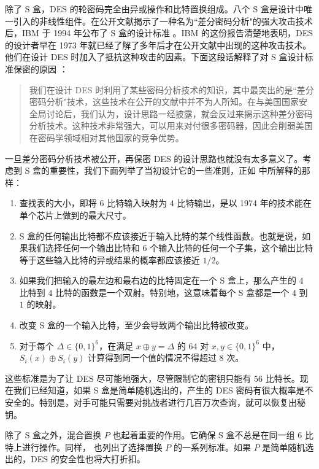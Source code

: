 \begin{snote}
\vspace*{10pt}

\noindent
除了 S 盒，DES 的轮密码完全由异或操作和比特置换组成。八个 S 盒是设计中唯一引入的非线性组件。在公开文献揭示了一种名为``差分密码分析"的强大攻击技术后，IBM 于 1994 年公布了 S 盒的设计标准 \cite{coppersmith1994data}。IBM 的这份报告清楚地表明，DES 的设计者早在 1973 年就已经了解了多年后才在公开文献中出现的这种攻击技术。他们在设计 DES 时加入了抵抗这种攻击的因素。下面这段话解释了对 S 盒设计标准保密的原因 \cite{coppersmith1994data}：
\begin{quote}
我们在设计 DES 时利用了某些密码分析技术的知识，其中最突出的是``差分密码分析"技术，这些技术在公开的文献中并不为人所知。在与美国国家安全局讨论后，我们认为，设计思路一经披露，就会反过来揭示这种差分密码分析技术。这种技术非常强大，可以用来对付很多密码器，因此会削弱美国在密码学领域相对其他国家的竞争优势。
\end{quote}
一旦差分密码分析技术被公开，再保密 DES 的设计思路也就没有太多意义了。考虑到 S 盒的重要性，我们下面列举了当初设计它的一些准则，正如 \cite{coppersmith1994data} 中所解释的那样：
\begin{enumerate}
	\item 查找表的大小，即将 $6$ 比特输入映射为 $4$ 比特输出，是以 1974 年的技术能在单个芯片上做到的最大尺寸。
	\item S 盒的任何输出比特都不应该接近于输入比特的某个线性函数。也就是说，如果我们选择任何一个输出比特和 $6$ 个输入比特的任何一个子集，这个输出比特等于这些输入比特的异或结果的概率都应该接近 $1/2$。
	\item 如果我们把输入的最左边和最右边的比特固定在一个 S 盒上，那么产生的 $4$ 比特到 $4$ 比特的函数是一个双射。特别地，这意味着每个 S 盒都是一个 $4$ 到 $1$ 的映射。
	\item 改变 S 盒的一个输入比特，至少会导致两个输出比特被改变。
	\item 对于每个 $\Delta\in\{0,1\}^6$，在满足 $x\oplus y=\Delta$ 的 $64$ 对 $x,y\in\{0,1\}^6$ 中，$S_i(x)\oplus S_i(y)$ 计算得到同一个值的情况不得超过 $8$ 次。
\end{enumerate}
这些标准是为了让 DES 尽可能地强大，尽管限制它的密钥只能有 $56$ 比特长。现在我们已经知道，如果 S 盒是简单随机选出的，产生的 DES 密码有很大概率是不安全的。特别是，对手可能只需要对挑战者进行几百万次查询，就可以恢复出秘钥。

除了 S 盒之外，混合置换 $P$ 也起着重要的作用。它确保 S 盒不总是在同一组 $6$ 比特上进行操作。同样，\cite{coppersmith1994data} 也列出了选择置换 $P$ 的一系列标准。如果 $P$ 是简单随机选出的，DES 的安全性也将大打折扣。

\end{snote}

